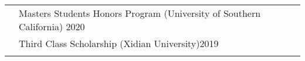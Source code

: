 \documentclass[letterpaper, 11pt]{article}
\begin{document}
\begin{longtable}{p{1.3in}p{4.8in}}












{\color{black}{Honors and}} 
& Masters Students Honors Program (University of Southern California) \hfill 2020\\
{\color{black}{scholarships}} 
& Third Class Scholarship (Xidian University)\hfill 2019 \\
& \\



\end{longtable}
\end{document}
